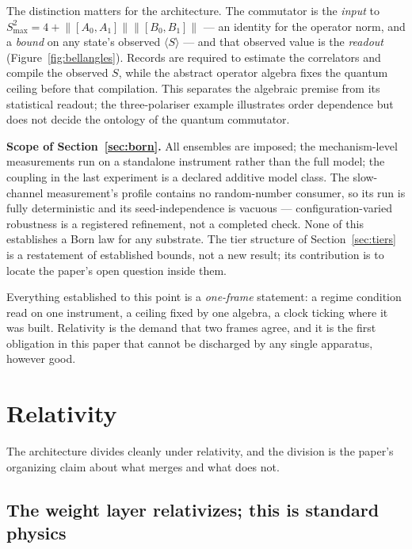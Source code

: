 \documentclass[11pt,a4paper]{article}
\theoremstyle{definition}
\theoremstyle{plain}
\theoremstyle{remark}
\begin{document}
The distinction matters for the architecture. The commutator is the
\emph{input} to $S_{\max}^2 = 4 +
\lVert[A_0,A_1]\rVert\lVert[B_0,B_1]\rVert$ --- an identity for the
operator norm, and a \emph{bound} on any state's observed $\langle
S\rangle$ --- and that observed value is the \emph{readout}
(Figure~\ref{fig:bellangles}). Records are required to estimate the
correlators and compile the observed $S$, while the abstract operator
algebra fixes the quantum ceiling before that compilation. This separates
the algebraic premise from its statistical readout; the three-polariser
example illustrates order dependence but does not decide the ontology of
the quantum commutator.

\begin{scopebox}
\textbf{Scope of Section~\ref{sec:born}.} All ensembles are imposed; the
mechanism-level measurements run on a standalone instrument rather than
the full model; the coupling in the last experiment is a declared
additive model class. The slow-channel measurement's profile contains no
random-number consumer, so its run is fully deterministic and its
seed-independence is vacuous --- configuration-varied robustness is a
registered refinement, not a completed check. None of this establishes a
Born law for any substrate. The tier structure of
Section~\ref{sec:tiers} is a restatement of established bounds, not a new
result; its contribution is to locate the paper's open question inside
them.
\end{scopebox}

Everything established to this point is a \emph{one-frame} statement: a
regime condition read on one instrument, a ceiling fixed by one
algebra, a clock ticking where it was built. Relativity is the demand
that two frames agree, and it is the first obligation in this paper
that cannot be discharged by any single apparatus, however good.

\section{Relativity}
\label{sec:relativity}

The architecture divides cleanly under relativity, and the division is
the paper's organizing claim about what merges and what does not.

\subsection{The weight layer relativizes; this is standard physics}
\end{document}

